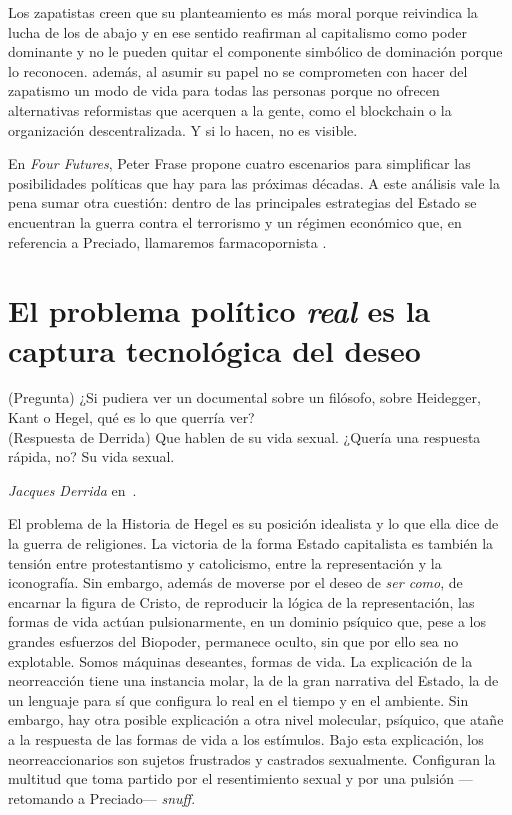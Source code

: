 Los zapatistas creen que su planteamiento es más moral porque reivindica la lucha de los de abajo y en ese sentido reafirman al capitalismo como poder dominante y no le pueden quitar el componente simbólico de dominación porque lo reconocen. además, al asumir su papel no se comprometen con hacer del zapatismo un modo de vida para todas las personas porque no ofrecen alternativas reformistas que acerquen a la gente, como el blockchain o la organización descentralizada. Y si lo hacen, no es visible.

En \emph{Four Futures}, Peter Frase propone cuatro escenarios para simplificar las posibilidades políticas que hay para las próximas décadas. A este análisis vale la pena sumar otra cuestión: dentro de las principales estrategias del Estado se encuentran la guerra contra el terrorismo y un régimen económico que, en referencia a Preciado, llamaremos farmacopornista \autocite{preciadoTestoYonqui2008,fraseFourFuturesVisions2016}.

\section{El problema político \emph{real} es la captura tecnológica del deseo}
\label{sec:el-problema-político-real}

\epigraph{(\textsf{Pregunta}) ¿Si pudiera ver un documental sobre un filósofo, sobre Heidegger, Kant o Hegel, qué es lo que querría ver?\\ (\textsf{Respuesta de Derrida}) Que hablen de su vida sexual. ¿Quería una respuesta rápida, no? Su vida sexual.}{\emph{Jacques Derrida} en~\autocite{dickScreenplayEssaysFilm2005}.}

El problema de la Historia de Hegel es su posición idealista y lo que ella dice de la guerra de religiones. La victoria de la forma Estado capitalista es también la tensión entre protestantismo y catolicismo, entre la representación y la iconografía. Sin embargo, además de moverse por el deseo de \emph{ser como}, de encarnar la figura de Cristo, de reproducir la lógica de la representación, las formas de vida actúan pulsionarmente, en un dominio psíquico que, pese a los grandes esfuerzos del Biopoder, permanece oculto, sin que por ello sea no explotable. Somos máquinas deseantes, formas de vida. La explicación de la neorreacción tiene una instancia molar, la de la gran narrativa del Estado, la de un lenguaje para sí que configura lo real en el tiempo y en el ambiente. Sin embargo, hay otra posible explicación a otra nivel molecular, psíquico, que atañe a la respuesta de las formas de vida a los estímulos. Bajo esta explicación, los neorreaccionarios son sujetos frustrados y castrados sexualmente. Configuran la multitud que toma partido por el resentimiento sexual y por una pulsión ---retomando a Preciado--- \emph{snuff}.

